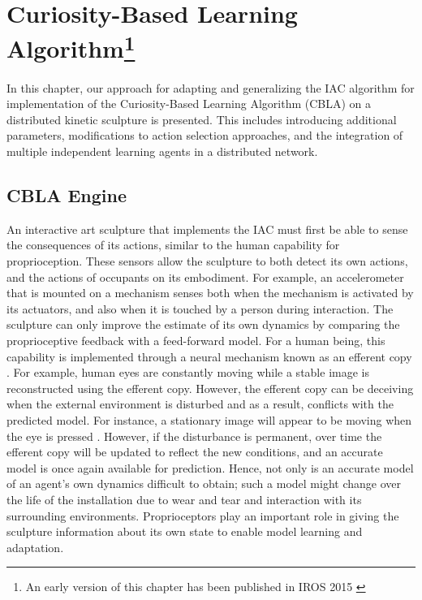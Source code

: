 \chapter[Curiosity-Based Learning Algorithm]
{Curiosity-Based Learning Algorithm\footnote{An early version of this chapter has been published in IROS 2015 \cite{Chan2015} }} 
\label{chap:cbla}

In this chapter, our approach for adapting and generalizing the IAC algorithm \cite{Oudeyer2007} for implementation of the Curiosity-Based Learning Algorithm (CBLA) on a distributed kinetic sculpture is presented. This includes introducing additional parameters, modifications to action selection approaches, and the integration of multiple independent learning agents in a distributed network. 


\section{CBLA Engine}

An interactive art sculpture that implements the IAC must first be able to sense the consequences of its actions, similar to the human capability for proprioception. These sensors allow the sculpture to both detect its own actions, and the actions of occupants on its embodiment. For example, an accelerometer that is mounted on a mechanism senses both when the mechanism is activated by its actuators, and also when it is touched by a person during interaction. The sculpture can only improve the estimate of its own dynamics by comparing the proprioceptive feedback with a feed-forward model. For a human being, this capability is implemented through a neural mechanism known as an efferent copy \cite{Bridgeman2007}. For example, human eyes are constantly moving while a stable image is reconstructed using the efferent copy. However, the efferent copy can be deceiving when the external environment is disturbed and as a result, conflicts with the predicted model. For instance, a stationary image will appear to be moving when the eye is pressed \cite{Bridgeman2007}. However, if the disturbance is permanent, over time the efferent copy will be updated to reflect the new conditions, and an accurate model is once again available for prediction. Hence, not only is an accurate model of an agent's own dynamics difficult to obtain; such a model might change over the life of the installation due to wear and tear and interaction with its surrounding environments. Proprioceptors play an important role in giving the sculpture information about its own state to enable model learning and adaptation.

